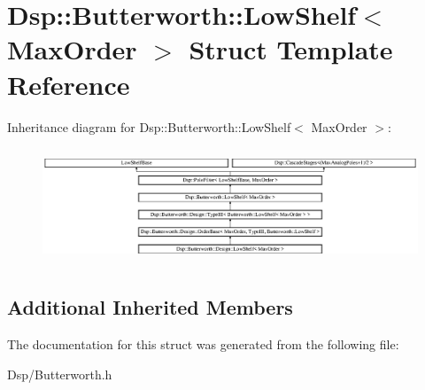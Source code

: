 \hypertarget{structDsp_1_1Butterworth_1_1LowShelf}{\section{Dsp\-:\-:Butterworth\-:\-:Low\-Shelf$<$ Max\-Order $>$ Struct Template Reference}
\label{structDsp_1_1Butterworth_1_1LowShelf}
}
Inheritance diagram for Dsp\-:\-:Butterworth\-:\-:Low\-Shelf$<$ Max\-Order $>$\-:\begin{figure}[H]
\begin{center}
\leavevmode
\includegraphics[height=3.471074cm]{structDsp_1_1Butterworth_1_1LowShelf}
\end{center}
\end{figure}
\subsection*{Additional Inherited Members}


The documentation for this struct was generated from the following file\-:\begin{DoxyCompactItemize}
\item 
Dsp/Butterworth.\-h\end{DoxyCompactItemize}
